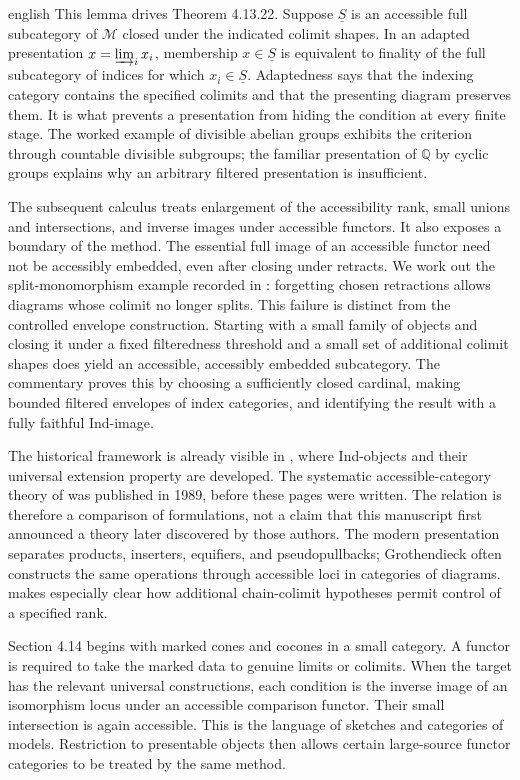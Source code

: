 \begin{otherlanguage*}{english}
This lemma drives Theorem 4.13.22. Suppose $\underline S$ is an accessible full subcategory of $\mathcal M$ closed under the indicated colimit shapes. In an adapted presentation $x=\varinjlim_i x_i$, membership $x\in\underline S$ is equivalent to finality of the full subcategory of indices for which $x_i\in\underline S$. Adaptedness says that the indexing category contains the specified colimits and that the presenting diagram preserves them. It is what prevents a presentation from hiding the condition at every finite stage. The worked example of divisible abelian groups exhibits the criterion through countable divisible subgroups; the familiar presentation of $\mathbb Q$ by cyclic groups explains why an arbitrary filtered presentation is insufficient.

The subsequent calculus treats enlargement of the accessibility rank, small unions and intersections, and inverse images under accessible functors. It also exposes a boundary of the method. The essential full image of an accessible functor need not be accessibly embedded, even after closing under retracts. We work out the split-monomorphism example recorded in \citet{Rosicky2009Combinatorial,BrookeTaylorRosicky2017}: forgetting chosen retractions allows diagrams whose colimit no longer splits. This failure is distinct from the controlled envelope construction. Starting with a small family of objects and closing it under a fixed filteredness threshold and a small set of additional colimit shapes does yield an accessible, accessibly embedded subcategory. The commentary proves this by choosing a sufficiently closed cardinal, making bounded filtered envelopes of index categories, and identifying the result with a fully faithful Ind-image.

The historical framework is already visible in \citet[Expos\'e I, 8.7]{SGA4I1972}, where Ind-objects and their universal extension property are developed. The systematic accessible-category theory of \citet{MakkaiPare1989} was published in 1989, before these pages were written. The relation is therefore a comparison of formulations, not a claim that this manuscript first announced a theory later discovered by those authors. The modern presentation separates products, inserters, equifiers, and pseudopullbacks; Grothendieck often constructs the same operations through accessible loci in categories of diagrams. \citet{Positselski2024Limits} makes especially clear how additional chain-colimit hypotheses permit control of a specified rank.

Section 4.14 begins with marked cones and cocones in a small category. A functor is required to take the marked data to genuine limits or colimits. When the target has the relevant universal constructions, each condition is the inverse image of an isomorphism locus under an accessible comparison functor. Their small intersection is again accessible. This is the language of sketches and categories of models. Restriction to presentable objects then allows certain large-source functor categories to be treated by the same method.


\end{otherlanguage*}

